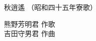 \documentclass[10pt,b5j]{tarticle} %
\begin{document}
\begin{minipage}[c]{0.7\hsize} %
    \begin{center}
        {\LARGE
            秋逍遙 %
        }
        {\small 
            （昭和四十五年寮歌） %
        }
    \end{center}
\end{minipage}
\begin{minipage}[c]{0.3\hsize} %
    \begin{flushright} %
        熊野芳明君 作歌\\吉田守男君 作曲 %
    \end{flushright}
\end{minipage}
\end{document}
